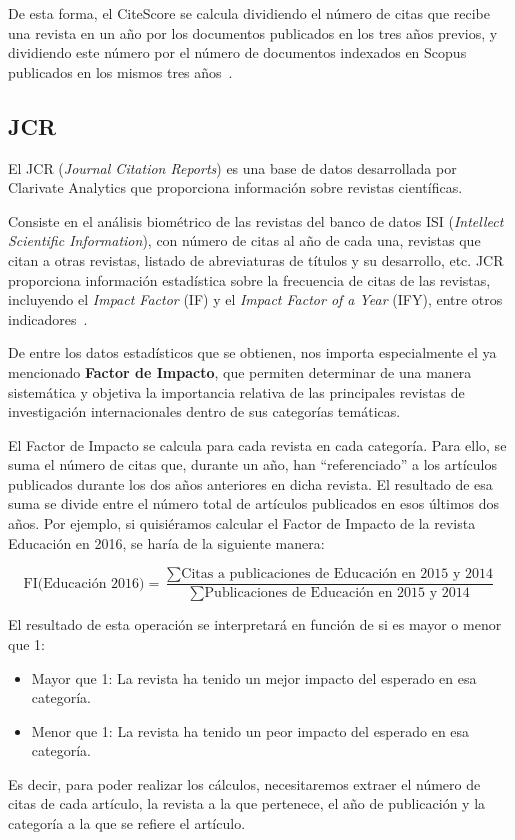 De esta forma, el CiteScore se calcula dividiendo el número de citas que recibe una revista en un año por los documentos publicados en los tres años previos, y dividiendo este número por el número de documentos indexados en Scopus publicados en los mismos tres años~\cite{Svetla2022}. 


\subsection{JCR}
El JCR (\textit{Journal Citation Reports}) es una base de datos desarrollada por Clarivate Analytics que proporciona información sobre revistas científicas.

Consiste en el análisis biométrico de las revistas del banco de datos ISI (\textit{Intellect Scientific Information}), con número de citas al año de cada una, revistas que citan a otras revistas, listado de abreviaturas de títulos y su desarrollo, etc. JCR proporciona información estadística sobre la frecuencia de citas de las revistas, incluyendo el \textit{Impact Factor} (IF) y el \textit{Impact Factor of a Year} (IFY), entre otros indicadores~\cite{clarivate2019}. 

De entre los datos estadísticos que se obtienen, nos importa especialmente el ya mencionado \textbf{Factor de Impacto}, que permiten determinar de una manera sistemática y objetiva la importancia relativa de las principales revistas de investigación internacionales dentro de sus categorías temáticas. 

El Factor de Impacto se calcula para cada revista en cada categoría. Para ello, se suma el número de citas que, durante un año, han ``referenciado'' a los artículos publicados durante los dos años anteriores en dicha revista. El resultado de esa suma se divide entre el número total de artículos publicados en esos últimos dos años.
Por ejemplo, si quisiéramos calcular el Factor de Impacto de la revista Educación en 2016, se haría de la siguiente manera:

\[
\text{FI(Educación 2016)} = \frac{\sum \text{Citas a publicaciones de Educación en 2015 y 2014}}{\sum \text{Publicaciones de Educación en 2015 y 2014}}
\]

 
El resultado de esta operación se interpretará en función de si es mayor o menor que 1:
\begin{itemize}
	\item Mayor que 1: La revista ha tenido un mejor impacto del esperado en esa categoría.
	\item Menor que 1: La revista ha tenido un peor impacto del esperado en esa categoría.
\end{itemize}
Es decir, para poder realizar los cálculos, necesitaremos extraer el número de citas de cada artículo, la revista a la que pertenece, el año de publicación y la categoría a la que se refiere el artículo.


